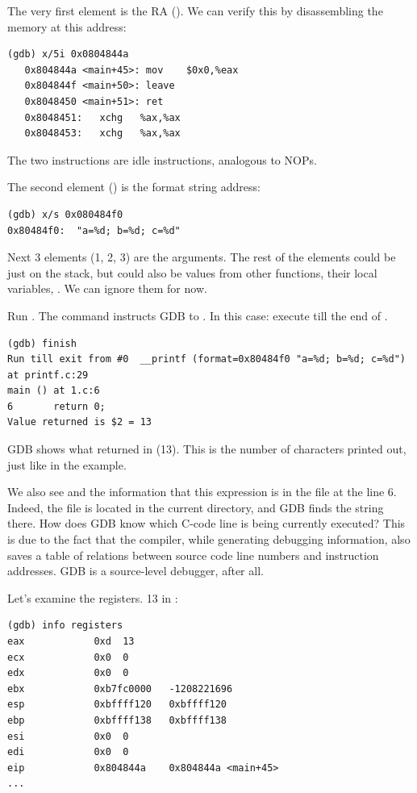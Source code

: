 The very first element is the \ac{RA} ().
We can verify this by disassembling the memory at this address:

\begin{lstlisting}[label=NOP_as_XCHG_example]
(gdb) x/5i 0x0804844a
   0x804844a <main+45>:	mov    $0x0,%eax
   0x804844f <main+50>:	leave  
   0x8048450 <main+51>:	ret    
   0x8048451:	xchg   %ax,%ax
   0x8048453:	xchg   %ax,%ax
\end{lstlisting}

The two  instructions are idle instructions, analogous to \ac{NOP}s.

The second element () is the format string address:

\begin{lstlisting}
(gdb) x/s 0x080484f0
0x80484f0:	"a=%d; b=%d; c=%d"
\end{lstlisting}

Next 3 elements (1, 2, 3) are the \printf arguments.
The rest of the elements could be just  on the stack, 
but could also be values from other functions, their local variables, \etc{}.
We can ignore them for now.

Run . 
The command instructs GDB to .
In this case: execute till the end of \printf.

\begin{lstlisting}
(gdb) finish
Run till exit from #0  __printf (format=0x80484f0 "a=%d; b=%d; c=%d") at printf.c:29
main () at 1.c:6
6		return 0;
Value returned is $2 = 13
\end{lstlisting}

\ac{GDB} shows what \printf returned in \EAX (13).
This is the number of characters printed out, just like in the \olly example.

We also see  and the information that this expression is in the  file at the line 6.
Indeed, the  file is located in the current directory, and \ac{GDB} finds the string there.
How does \ac{GDB} know which C-code line is being currently executed?
This is due to the fact that the compiler,
while generating debugging information, also saves a table of relations between source code line
numbers and instruction addresses.
GDB is a source-level debugger, after all.

Let's examine the registers.
13 in \EAX:

\begin{lstlisting}
(gdb) info registers
eax            0xd	13
ecx            0x0	0
edx            0x0	0
ebx            0xb7fc0000	-1208221696
esp            0xbffff120	0xbffff120
ebp            0xbffff138	0xbffff138
esi            0x0	0
edi            0x0	0
eip            0x804844a	0x804844a <main+45>
...
\end{lstlisting}

